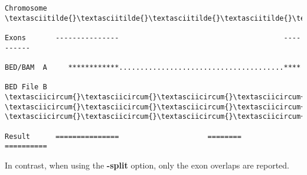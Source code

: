 \documentclass[letterpaper,10pt,english]{sphinxmanual}
\begin{document}
\begin{Verbatim}[commandchars=\\\{\}]
Chromosome  \textasciitilde{}\textasciitilde{}\textasciitilde{}\textasciitilde{}\textasciitilde{}\textasciitilde{}\textasciitilde{}\textasciitilde{}\textasciitilde{}\textasciitilde{}\textasciitilde{}\textasciitilde{}\textasciitilde{}\textasciitilde{}\textasciitilde{}\textasciitilde{}\textasciitilde{}\textasciitilde{}\textasciitilde{}\textasciitilde{}\textasciitilde{}\textasciitilde{}\textasciitilde{}\textasciitilde{}\textasciitilde{}\textasciitilde{}\textasciitilde{}\textasciitilde{}\textasciitilde{}\textasciitilde{}\textasciitilde{}\textasciitilde{}\textasciitilde{}\textasciitilde{}\textasciitilde{}\textasciitilde{}\textasciitilde{}\textasciitilde{}\textasciitilde{}\textasciitilde{}\textasciitilde{}\textasciitilde{}\textasciitilde{}\textasciitilde{}\textasciitilde{}\textasciitilde{}\textasciitilde{}\textasciitilde{}\textasciitilde{}\textasciitilde{}\textasciitilde{}\textasciitilde{}\textasciitilde{}\textasciitilde{}\textasciitilde{}\textasciitilde{}\textasciitilde{}\textasciitilde{}\textasciitilde{}\textasciitilde{}\textasciitilde{}\textasciitilde{}\textasciitilde{}\textasciitilde{}

Exons       ---------------                                       ----------

BED/BAM  A     ************.......................................****

BED File B  \textasciicircum{}\textasciicircum{}\textasciicircum{}\textasciicircum{}\textasciicircum{}\textasciicircum{}\textasciicircum{}\textasciicircum{}\textasciicircum{}\textasciicircum{}\textasciicircum{}\textasciicircum{}\textasciicircum{}\textasciicircum{}\textasciicircum{}                     \textasciicircum{}\textasciicircum{}\textasciicircum{}\textasciicircum{}\textasciicircum{}\textasciicircum{}\textasciicircum{}\textasciicircum{}          \textasciicircum{}\textasciicircum{}\textasciicircum{}\textasciicircum{}\textasciicircum{}\textasciicircum{}\textasciicircum{}\textasciicircum{}\textasciicircum{}\textasciicircum{}

Result      ===============                     ========          ==========
\end{Verbatim}

In contrast, when using the \textbf{-split} option, only the exon overlaps are reported.
\end{document}
